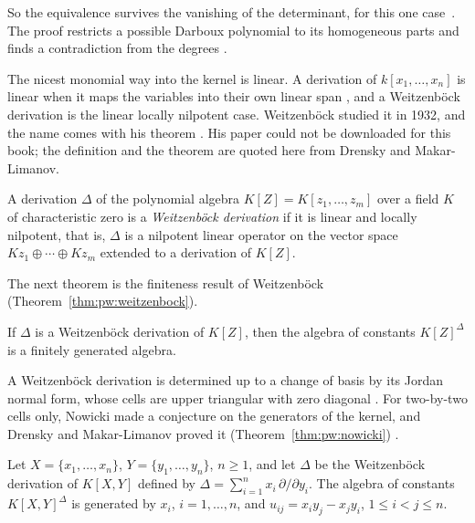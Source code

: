 So the equivalence survives the vanishing of the determinant, for this one
case~\cite[p.~3]{Li2015DarbouxMonomial}. The proof restricts a possible Darboux polynomial to its homogeneous
parts and finds a contradiction from the degrees
\cite[p.~3]{Li2015DarbouxMonomial}.

The nicest monomial way into the kernel is linear. A derivation of
$k[x_{1},\dots,x_{n}]$ is linear when it maps the variables into their own
linear span \cite[p.~394]{DrenskyGupta2005}, and a Weitzenb\"ock
derivation is the linear locally nilpotent case. Weitzenb\"ock studied it
in 1932, and the name comes with his theorem
\cite[p.~41]{DrenskyMakarLimanov2009}. His paper could not be downloaded
for this book; the definition and the theorem are quoted here from Drensky
and Makar-Limanov.

\begin{definition}\label{def:pw:weitzenbock}
A derivation $\Delta$ of the polynomial algebra $K[Z]=K[z_{1},\dots,z_{m}]$
over a field $K$ of characteristic zero is a \emph{Weitzenb\"ock
derivation} if it is linear and locally nilpotent, that is, $\Delta$ is a
nilpotent linear operator on the vector space
$Kz_{1}\oplus\cdots\oplus Kz_{m}$ extended to a derivation of $K[Z]$.
\end{definition}

The next theorem is the finiteness result of Weitzenb\"ock
(Theorem~\ref{thm:pw:weitzenbock}).

\begin{theorem}\label{thm:pw:weitzenbock}
If $\Delta$ is a Weitzenb\"ock derivation of $K[Z]$, then the algebra of
constants $K[Z]^{\Delta}$ is a finitely generated algebra.
\end{theorem}

A Weitzenb\"ock derivation is determined up to a change of basis by its Jordan
normal form, whose cells are upper triangular with zero diagonal
\cite[p.~42]{DrenskyMakarLimanov2009}. For two-by-two cells only, Nowicki made
a conjecture on the generators of the kernel, and Drensky and Makar-Limanov
proved it (Theorem~\ref{thm:pw:nowicki})
\cite[pp.~42--45]{DrenskyMakarLimanov2009}.

\begin{theorem}\label{thm:pw:nowicki}
Let $X=\{x_{1},\dots,x_{n}\}$, $Y=\{y_{1},\dots,y_{n}\}$, $n\geq 1$, and
let $\Delta$ be the Weitzenb\"ock derivation of $K[X,Y]$ defined by
$\Delta=\sum_{i=1}^{n} x_{i}\,\partial/\partial y_{i}$. The algebra of
constants $K[X,Y]^{\Delta}$ is generated by $x_{i}$, $i=1,\dots,n$, and
$u_{ij}=x_{i}y_{j}-x_{j}y_{i}$, $1\leq i<j\leq n$.
\end{theorem}

